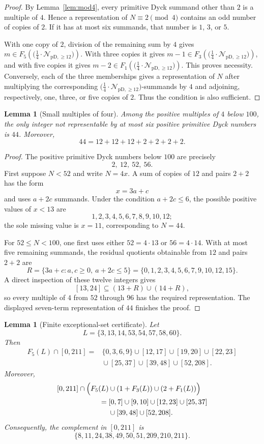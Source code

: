 \documentclass[12pt]{article}
\theoremstyle{plain}
\newtheorem{lemma}[theorem]{Lemma}
\theoremstyle{definition}
\theoremstyle{plain}
\newcommand{\Pset}{%
  \bigl(\tfrac{1}{4}\cdot\mathcal{N}_{\mathrm{pD},\geq 12}\bigr)%
}
\begin{document}
\begin{proof}
By Lemma~\ref{lem:mod4}, every primitive Dyck summand other than $2$ is
a multiple of $4$.  Hence a representation of $N\equiv2\pmod 4$ contains
an odd number of copies of $2$.  If it has at most six summands, that
number is $1$, $3$, or $5$.

With one copy of $2$, division of the remaining sum by $4$ gives
$m\in F_5(\Pset)$.  With three copies it gives
$m-1\in F_3(\Pset)$, and with five copies it gives
$m-2\in F_1(\Pset)$.  This proves necessity.  Conversely, each of the
three memberships gives a representation of $N$ after multiplying the
corresponding $\Pset$-summands by $4$ and adjoining, respectively, one,
three, or five copies of $2$.  Thus the condition is also sufficient.
\end{proof}

\begin{lemma}[Small multiples of four]\label{lem:smallmultiples}
Among the positive multiples of $4$ below $100$, the only integer not
representable by at most six positive primitive Dyck numbers is $44$.
Moreover,
\[
 44=12+12+12+2+2+2+2.
\]
\end{lemma}

\begin{proof}
The positive primitive Dyck numbers below $100$ are precisely
\[
 2,\ 12,\ 52,\ 56.
\]
First suppose $N<52$ and write $N=4x$.  A sum of copies of $12$ and
pairs $2+2$ has the form
\[
 x=3a+c
\]
and uses $a+2c$ summands.  Under the condition $a+2c\leq6$, the possible
positive values of $x<13$ are
\[
 1,2,3,4,5,6,7,8,9,10,12;
\]
the sole missing value is $x=11$, corresponding to $N=44$.

For $52\leq N<100$, one first uses either $52=4\cdot13$ or
$56=4\cdot14$.  With at most five remaining summands, the residual
quotients obtainable from $12$ and pairs $2+2$ are
\[
 R=\{3a+c:a,c\geq0,\ a+2c\leq5\}
   =\{0,1,2,3,4,5,6,7,9,10,12,15\}.
\]
A direct inspection of these twelve integers gives
\[
 [13,24]\subseteq(13+R)\cup(14+R),
\]
so every multiple of $4$ from $52$ through $96$ has the required
representation.  The displayed seven-term representation of $44$
finishes the proof.
\end{proof}

\begin{lemma}[Finite exceptional-set certificate]\label{lem:finiteexception}
Let
\[
 L=\{3,13,14,53,54,57,58,60\}.
\]
Then
\[
\begin{aligned}
F_5(L)\cap[0,211]
={}&\{0,3,6,9\}\cup[12,17]\cup[19,20]\cup[22,23]\\
 &{}\cup[25,37]\cup[39,48]\cup[52,208].
\end{aligned}
\]
Moreover,
\[
\begin{aligned}
[0,211]\cap\Bigl(F_5(L)&\cup(1+F_3(L))\cup(2+F_1(L))\Bigr)\\
={}&[0,7]\cup[9,10]\cup[12,23]\cup[25,37]\\
 &{}\cup[39,48]\cup[52,208].
\end{aligned}
\]
Consequently, the complement in $[0,211]$ is
\[
 \{8,11,24,38,49,50,51,209,210,211\}.
\]
\end{lemma}
\end{document}
